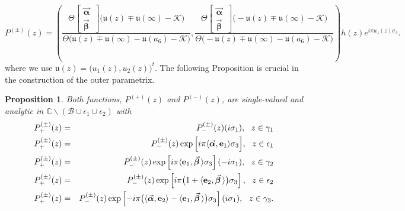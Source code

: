 \documentclass[10pt,oneside,reqno]{amsart}
\numberwithin{equation}{section}
\newtheorem{proposition}[theorem]{Proposition}
\def\bp{\begin{proposition}}
\def\ep{\end{proposition}}
\begin{document}
\begin{equation*}
  P^{(\pm)}(z) = \left(\frac{\Theta\begin{bmatrix}
         \vec{\boldsymbol \alpha}\,\\
\vec{\boldsymbol \beta}\,
        \end{bmatrix}\big(\mathfrak{u}(z)\mp\mathfrak{u}(\infty)-\mathcal{K}\big)}{\Theta\big(\mathfrak{u}(z)\mp\mathfrak{u}(\infty)-\mathfrak{u}(a_6)-\mathcal{K}\big)},
\frac{\Theta\begin{bmatrix}
         \vec{\boldsymbol \alpha}\,\\
\vec{\boldsymbol \beta}\,
        \end{bmatrix}\big(-\mathfrak{u}(z)\mp\mathfrak{u}(\infty)-\mathcal{K}\big)}{\Theta\big(-\mathfrak{u}(z)\mp\mathfrak{u}(\infty)-\mathfrak{u}(a_6)-\mathcal{K}\big)}
\right)h(z)e^{i\pi  u_1(z)\sigma_3}.
\end{equation*}
where we use $\mathfrak{u}(z)=\big(u_1(z),u_2(z)\big)^t$. The following Proposition is crucial in the construction of the outer parametrix.
\bp Both functions, $P^{(+)}(z)$ and $P^{(-)}(z)$, are single-valued and analytic in $\mathbb{C}\backslash(\mathcal{B}\cup\epsilon_1\cup\epsilon_2)$ with
\begin{eqnarray*}
  P^{(\pm)}_+(z) &=&P^{(\pm)}_-(z)(i\sigma_1),\ \ z\in \gamma_1\\
  P^{(\pm)}_+(z) &=&P^{(\pm)}_-(z)\exp\Big[i\pi\langle\vec{\boldsymbol \alpha},{\bf e}_1\rangle\sigma_3\Big],\ \ z\in \epsilon_1\\
  P^{(\pm)}_+(z) &=&P^{(\pm)}_-(z)\exp\left[i\pi\langle{\bf e}_1,\vec{\boldsymbol \beta}\,\rangle\sigma_3\right](-i\sigma_1),\ \ z\in \gamma_2\\
  P^{(\pm)}_+(z) &=&P^{(\pm)}_-(z)\exp\left[i\pi\big(1+\langle{\bf e}_2,\vec{\boldsymbol \beta}\,\rangle\big)\sigma_3\right],\ \ z\in \epsilon_2\\
  P^{(\pm)}_+(z) &=&P^{(\pm)}_-(z)\exp\left[-i\pi\big(\langle\vec{\boldsymbol \alpha},{\bf e}_2\rangle-\langle{\bf e}_1,\vec{\boldsymbol \beta}\,\rangle\big)\sigma_3\right](i\sigma_1),\ \ z\in\gamma_3.
\end{eqnarray*}
\ep
\end{document}
